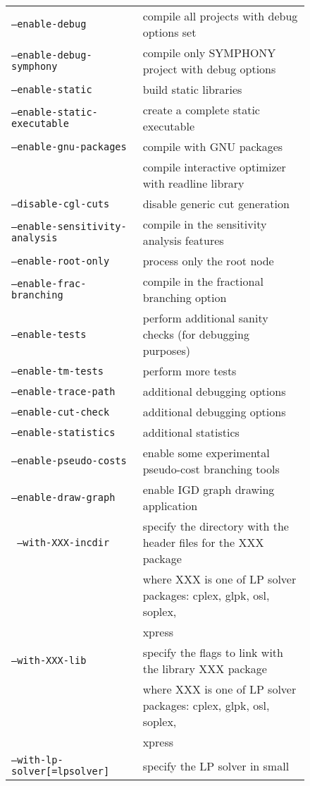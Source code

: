\begin{figure}[htb]
\begin{tabular}{ll}
\hline
\texttt{--enable-debug} & compile all projects with debug options set \\
\texttt{--enable-debug-symphony} & compile only SYMPHONY project with debug options \\
\texttt{--enable-static} & build static libraries \\
\texttt{--enable-static-executable} &  create a complete static executable \\
\texttt{--enable-gnu-packages} & compile with GNU packages \\ 
& compile interactive optimizer with readline library \\
\hline
\texttt{--disable-cgl-cuts} & disable generic cut generation \\
\texttt{--enable-sensitivity-analysis} & compile in the sensitivity analysis features \\
\texttt{--enable-root-only} & process only the root node \\
\texttt{--enable-frac-branching} & compile in the fractional branching option \\
\texttt{--enable-tests}&  perform additional sanity checks (for debugging purposes) \\
\texttt{--enable-tm-tests }& perform more tests  \\
\texttt{--enable-trace-path}&  additional debugging options \\
\texttt{--enable-cut-check}& additional debugging options \\
\texttt{--enable-statistics}& additional statistics \\
\texttt{--enable-pseudo-costs}& enable some experimental pseudo-cost branching tools \\
\texttt{--enable-draw-graph} &  enable IGD graph drawing application \\
\hline
\texttt{ --with-XXX-incdir} &  specify the directory with the header files for the XXX package \\ 
&where XXX is one of LP solver packages: cplex, glpk, osl, soplex, \\ 
& xpress \\
\texttt{--with-XXX-lib} &  specify the flags to link with the library  
XXX package \\ 
&where XXX is one of LP solver packages: cplex, glpk, osl, soplex, \\ 
& xpress \\
\texttt{--with-lp-solver[=lpsolver]} &  specify the LP solver in small 

\end{tabular}
\end{figure}
